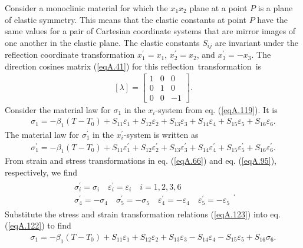 \documentclass{AeroStructure-ERJohnson}
\begin{document}
Consider a monoclinic material for which the $x_{1} x_{2}$ plane at a point $P$ is a plane of elastic symmetry. This means that the elastic constants at point $P$ have the same values for a pair of Cartesian coordinate systems that are mirror images of one another in the elastic plane. The elastic constants $S_{ij}$ are invariant under the reflection   coordinate transformation $x_{1}^{\prime}=x_{1}$, $x_{2}^{\prime}=x_{2}$, and $x_{3}^{\prime}=-x_{3}$. The direction cosines matrix (\ref{eqA.41}) for this reflection~transforma\-tion~is
\begin{align}\label{eqA.120}
[\lambda]=\left[\begin{array}{ccc}1 & 0 & 0 \\0 & 1 & 0 \\0 & 0 & -1\end{array}\right].
\end{align}
Consider the material law for $\sigma_{1}$ in the $x_{i}$-system from eq. (\ref{eqA.119}). It is
\begin{align}\label{eqA.121}
\sigma_{1}=-\beta_{1}(T-T_{0})+S_{11} \varepsilon_{1}+S_{12} \varepsilon_{2}+S_{13} \varepsilon_{3}+S_{14} \varepsilon_{4}+S_{15} \varepsilon_{5}+S_{16} \varepsilon_{6}.
\end{align}
The material law for $\sigma_{1}^{\prime}$ in the $x_{i}^{\prime}$-system is written as
\begin{align}\label{eqA.122}
\sigma_{1}^{\prime}=-\beta_{1}(T-T_{0})+S_{11} \varepsilon_{1}^{\prime}+S_{12} \varepsilon_{2}^{\prime}+S_{13} \varepsilon_{3}^{\prime}+S_{14} \varepsilon_{4}^{\prime}+S_{15} \varepsilon_{5}^{\prime}+S_{16} \varepsilon_{6}^{\prime}.
\end{align}
From strain and stress transformations in eq. (\ref{eqA.66}) and eq. (\ref{eqA.95}), respectively, we find
\begin{align}\label{eqA.123}	
\begin{gathered}
\sigma_{i}^{\prime}=\sigma_{i} \quad \varepsilon_{i}^{\prime}=\varepsilon_{i} \quad i=1,2,3,6 \\
\sigma_{4}^{\prime}=-\sigma_{4} \quad \sigma_{5}^{\prime}=-\sigma_{5} \quad \varepsilon_{4}^{\prime}=-\varepsilon_{4} \quad \varepsilon_{5}^{\prime}=-\varepsilon_{5}
\end{gathered}.
\end{align}
Substitute the stress and strain transformation relations (\ref{eqA.123}) into eq. (\ref{eqA.122}) to find
\begin{align}\label{eqA.124}
\sigma_{1}=-\beta_{1}(T-T_{0})+S_{11} \varepsilon_{1}+S_{12} \varepsilon_{2}+S_{13} \varepsilon_{3}-S_{14} \varepsilon_{4}-S_{15} \varepsilon_{5}+S_{16} \sigma_{6}.
\end{align}
\end{document}

